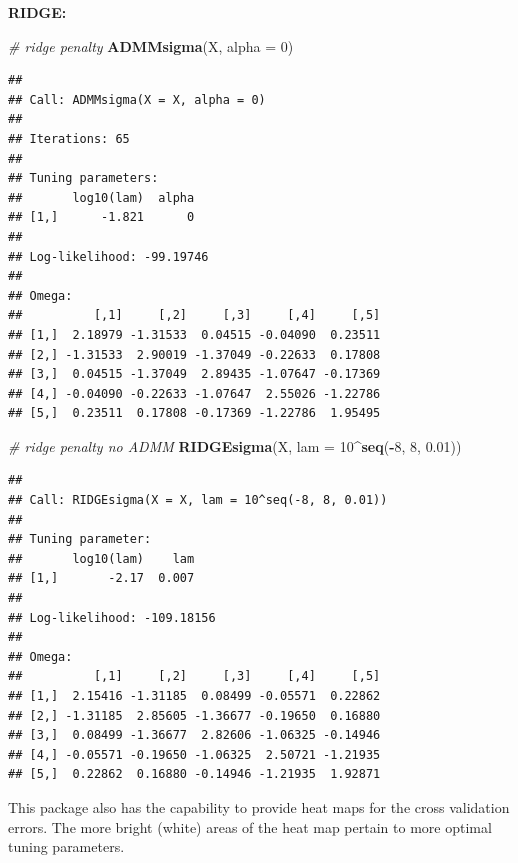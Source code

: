 \documentclass[12pt,]{book}
\newenvironment{Shaded}{\begin{snugshade}}{\end{snugshade}}
\newcommand{\CommentTok}[1]{\textcolor[rgb]{0.56,0.35,0.01}{\textit{#1}}}
\newcommand{\DataTypeTok}[1]{\textcolor[rgb]{0.13,0.29,0.53}{#1}}
\newcommand{\DecValTok}[1]{\textcolor[rgb]{0.00,0.00,0.81}{#1}}
\newcommand{\FloatTok}[1]{\textcolor[rgb]{0.00,0.00,0.81}{#1}}
\newcommand{\KeywordTok}[1]{\textcolor[rgb]{0.13,0.29,0.53}{\textbf{#1}}}
\newcommand{\NormalTok}[1]{#1}
\newcommand{\OperatorTok}[1]{\textcolor[rgb]{0.81,0.36,0.00}{\textbf{#1}}}
\theoremstyle{definition}
\theoremstyle{definition}
\theoremstyle{definition}
\theoremstyle{remark}
\begin{document}
\newpage

\textbf{RIDGE:}

\vspace{0.5cm}

\begin{Shaded}
\begin{Highlighting}[]
\CommentTok{# ridge penalty}
\KeywordTok{ADMMsigma}\NormalTok{(X, }\DataTypeTok{alpha =} \DecValTok{0}\NormalTok{)}
\end{Highlighting}
\end{Shaded}

\begin{verbatim}
## 
## Call: ADMMsigma(X = X, alpha = 0)
## 
## Iterations: 65
## 
## Tuning parameters:
##       log10(lam)  alpha
## [1,]      -1.821      0
## 
## Log-likelihood: -99.19746
## 
## Omega:
##          [,1]     [,2]     [,3]     [,4]     [,5]
## [1,]  2.18979 -1.31533  0.04515 -0.04090  0.23511
## [2,] -1.31533  2.90019 -1.37049 -0.22633  0.17808
## [3,]  0.04515 -1.37049  2.89435 -1.07647 -0.17369
## [4,] -0.04090 -0.22633 -1.07647  2.55026 -1.22786
## [5,]  0.23511  0.17808 -0.17369 -1.22786  1.95495
\end{verbatim}

\begin{Shaded}
\begin{Highlighting}[]
\CommentTok{# ridge penalty no ADMM}
\KeywordTok{RIDGEsigma}\NormalTok{(X, }\DataTypeTok{lam =} \DecValTok{10}\OperatorTok{^}\KeywordTok{seq}\NormalTok{(}\OperatorTok{-}\DecValTok{8}\NormalTok{, }\DecValTok{8}\NormalTok{, }\FloatTok{0.01}\NormalTok{))}
\end{Highlighting}
\end{Shaded}

\begin{verbatim}
## 
## Call: RIDGEsigma(X = X, lam = 10^seq(-8, 8, 0.01))
## 
## Tuning parameter:
##       log10(lam)    lam
## [1,]       -2.17  0.007
## 
## Log-likelihood: -109.18156
## 
## Omega:
##          [,1]     [,2]     [,3]     [,4]     [,5]
## [1,]  2.15416 -1.31185  0.08499 -0.05571  0.22862
## [2,] -1.31185  2.85605 -1.36677 -0.19650  0.16880
## [3,]  0.08499 -1.36677  2.82606 -1.06325 -0.14946
## [4,] -0.05571 -0.19650 -1.06325  2.50721 -1.21935
## [5,]  0.22862  0.16880 -0.14946 -1.21935  1.92871
\end{verbatim}

\newpage

This package also has the capability to provide heat maps for the cross
validation errors. The more bright (white) areas of the heat map pertain
to more optimal tuning parameters.
\end{document}
